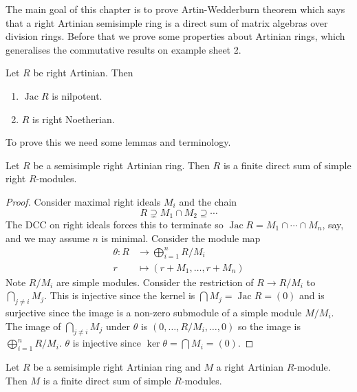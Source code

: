 \documentclass[a4paper]{article}
\DeclareMathOperator{\jac}{Jac} %
\begin{document}
The main goal of this chapter is to prove Artin-Wedderburn theorem which says that a right Artinian semisimple ring is a direct sum of matrix algebras over division rings. Before that we prove some properties about Artinian rings, which generalises the commutative results on example sheet 2.

\begin{theorem}
  \label{thm:properties of Artinian rings}
  Let \(R\) be right Artinian. Then
  \begin{enumerate}
  \item \(\jac R\) is nilpotent.
  \item \(R\) is right Noetherian.
  \end{enumerate}
\end{theorem}

To prove this we need some lemmas and terminology.

\begin{lemma}
  Let \(R\) be a semisimple right Artinian ring. Then \(R\) is a finite direct sum of simple right \(R\)-modules.
\end{lemma}

\begin{proof}
  Consider maximal right ideals \(M_i\) and the chain
  \[
    R \supsetneq M_1 \cap M_2 \supseteq \cdots
  \]
  The DCC on right ideals forces this to terminate so \(\jac R = M_1 \cap \cdots \cap M_n\), say, and we may assume \(n\) is minimal. Consider the module map
  \begin{align*}
    \theta: R &\to \bigoplus_{i = 1}^n R/M_i \\
    r &\mapsto (r + M_1, \dots, r + M_n)
  \end{align*}
  Note \(R/M_i\) are simple modules. Consider the restriction of \(R \to R/M_i\) to \(\bigcap_{j \ne i} M_j\). This is injective since the kernel is \(\bigcap M_j = \jac R = (0)\) and is surjective since the image is a non-zero submodule of a simple module \(M/M_i\). The image of \(\bigcap_{j \neq i} M_j\) under \(\theta\) is \((0, \dots, R/M_i, \dots, 0)\) so the image is \(\bigoplus_{i = 1}^n R/M_i\). \(\theta\) is injective since \(\ker \theta = \bigcap M_i = (0)\).
\end{proof}

\begin{lemma}
  Let \(R\) be a semisimple right Artinian ring and \(M\) a right Artinian \(R\)-module. Then \(M\) is a finite direct sum of simple \(R\)-modules.
\end{lemma}
\end{document}
